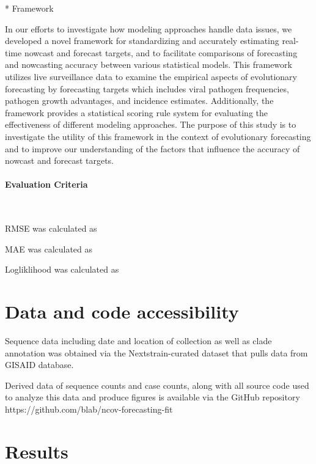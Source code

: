 \documentclass[11pt,oneside,letterpaper]{article}
\begin{document}
* Framework

In our efforts to investigate how modeling approaches handle data issues, we developed a novel framework for standardizing and accurately estimating real-time nowcast and forecast targets, and to facilitate comparisons of forecasting and nowcasting accuracy between various statistical models.
This framework utilizes live surveillance data to examine the empirical aspects of evolutionary forecasting by forecasting targets which includes viral pathogen frequencies, pathogen growth advantages, and incidence estimates. 
Additionally, the framework provides a statistical scoring rule system for evaluating the effectiveness of different modeling approaches.
The purpose of this study is to investigate the utility of this framework in the context of evolutionary forecasting and to improve our understanding of the factors that influence the accuracy of nowcast and forecast targets.


\paragraph{Evaluation Criteria}\

RMSE was calculated as


MAE was calculated as


Logliklihood was calculated as






\section*{Data and code accessibility}

Sequence data including date and location of collection as well as clade annotation was obtained via the Nextstrain-curated
dataset that pulls data from GISAID database. 



Derived data of sequence counts and case counts, along with all source code used to analyze
this data and produce figures is available via the GitHub repository https://github.com/blab/ncov-forecasting-fit





\section*{Results} 
\end{document}
